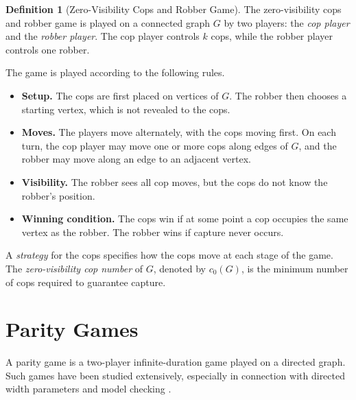 \documentclass[10pt]{book}
\theoremstyle{definition}
\newtheorem{definition}[theorem]{Definition}
\begin{document}
\begin{definition}[Zero-Visibility Cops and Robber Game]
\cite{dereniowski2015zero}
The zero-visibility cops and robber game is played on a connected graph \(G\) by two players: the \emph{cop player} and the \emph{robber player}.  
The cop player controls \(k\) cops, while the robber player controls one robber.

The game is played according to the following rules.
\begin{itemize}
    \item \textbf{Setup.} The cops are first placed on vertices of \(G\). The robber then chooses a starting vertex, which is not revealed to the cops.

    \item \textbf{Moves.} The players move alternately, with the cops moving first. On each turn, the cop player may move one or more cops along edges of \(G\), and the robber may move along an edge to an adjacent vertex.

    \item \textbf{Visibility.} The robber sees all cop moves, but the cops do not know the robber's position.

    \item \textbf{Winning condition.} The cops win if at some point a cop occupies the same vertex as the robber. The robber wins if capture never occurs.
\end{itemize}

A \emph{strategy} for the cops specifies how the cops move at each stage of the game.  
The \emph{zero-visibility cop number} of \(G\), denoted by \(c_0(G)\), is the minimum number of cops required to guarantee capture.
\end{definition}

\section{Parity Games}

A parity game is a two-player infinite-duration game played on a directed graph.  
Such games have been studied extensively, especially in connection with directed width parameters and model checking \cite{berwanger2006dag,staniszewski2022parity,puchala2011graph}.
\end{document}
